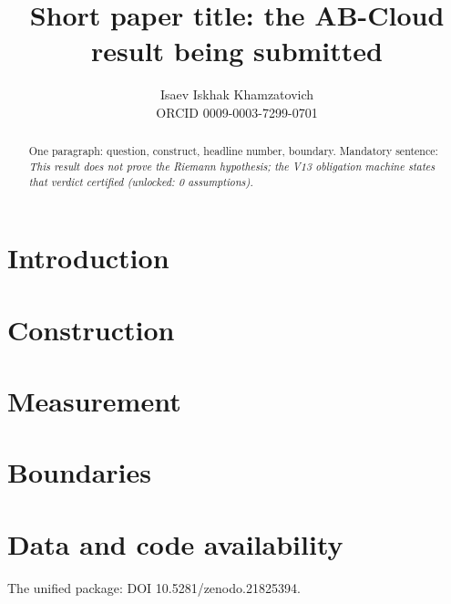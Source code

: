 \documentclass[11pt,a4paper]{article}
\title{Short paper title: the AB-Cloud result being submitted}
\author{Isaev Iskhak Khamzatovich\\ ORCID 0009-0003-7299-0701}
\begin{document}
\maketitle
\begin{abstract}
One paragraph: question, construct, headline number, boundary.
Mandatory sentence: \emph{This result does not prove the Riemann hypothesis;
the V13 obligation machine states that verdict certified (unlocked: 0 assumptions).}
\end{abstract}
\section{Introduction}
\section{Construction}
\section{Measurement}
\section{Boundaries}
\section{Data and code availability}
The unified package: DOI 10.5281/zenodo.21825394.


\end{document}
